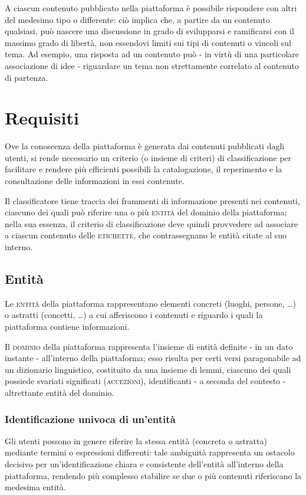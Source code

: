 \documentclass[10pt,a4paper,headinclude,footinclude,hidelinks]{scrreprt} %
\begin{document}
	A ciascun contenuto pubblicato nella piattaforma è possibile rispondere con altri del medesimo tipo o differente: ciò implica che, a partire da un contenuto qualsiasi, può nascere una discussione in grado di svilupparsi e ramificarsi con il massimo grado di libertà, non essendovi limiti sui tipi di contenuti o vincoli sul tema. Ad esempio, una risposta ad un contenuto può - in virtù di una particolare associazione di idee - riguardare un tema non strettamente correlato al contenuto di partenza.
	
	\chapter{Requisiti}
	\label{ch:stage:req}
	Ove la conoscenza della piattaforma è generata dai contenuti pubblicati dagli utenti, si rende necessario un criterio (o insieme di criteri) di classificazione per facilitare e rendere più efficienti possibili la catalogazione, il reperimento e la consultazione delle informazioni in essi contenute.

	Il classificatore tiene traccia dei frammenti di informazione presenti nei contenuti, ciascuno dei quali può riferire una o più \textsc{entità} del dominio della piattaforma; nella sua essenza, il criterio di classificazione deve quindi provvedere ad associare a ciascun contenuto delle \textsc{etichette}, che contrassegnano le entità citate al suo interno.

	\section{Entit\`a}
	\label{sec:stage:req:entità}
	Le \textsc{entità} della piattaforma rappresentano elementi concreti (luoghi, persone, \ldots) o astratti (concetti, \ldots) a cui afferiscono i contenuti e riguardo i quali la piattaforma contiene informazioni.

	Il \textsc{dominio} della piattaforma rappresenta l'insieme di entità definite - in un dato instante - all'interno della piattaforma; esso risulta per certi versi paragonabile ad un dizionario linguistico, costituito da una insieme di lemmi, ciascuno dei quali possiede svariati significati (\textsc{accezioni}), identificanti - a seconda del contesto - altrettante entità del dominio.

	\subsection{Identificazione univoca di un'entit\`a}
	Gli utenti possono in genere riferire la stessa entità (concreta o astratta) mediante termini o espressioni differenti: tale ambiguità rappresenta un ostacolo decisivo per un'identificazione chiara e consistente dell'entità all'interno della piattaforma, rendendo più complesso stabilire se due o più contenuti riferiscano la medesima entità.
\end{document}
